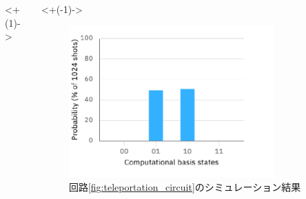 \begin{frame}
\begin{itemize}
\begin{columns}
\begin{column}{0.6\textwidth}
        \uncover<+(1)->{%
        }
      \end{column}
      \begin{column}{0.4\textwidth}
        \uncover<+(-1)->{%
          \begin{figure}
            \includegraphics[width=0.8\textwidth]{./img/cz_teleportation_histogram.pdf}
            \caption{回路\ref{fig:teleportation_circuit}のシミュレーション結果}
          \end{figure}
        }
      \end{column}
    \end{columns}
  \end{itemize}
\end{frame}

